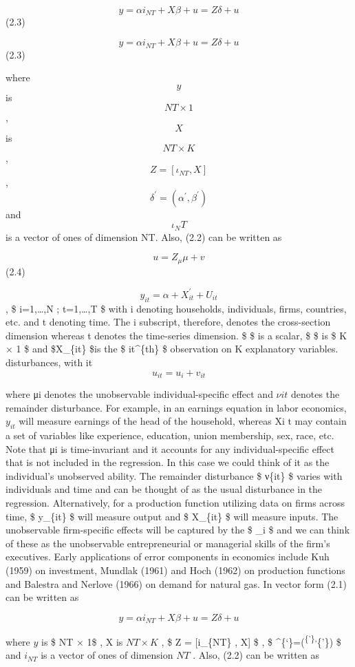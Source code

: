 \documentclass[
]{book}
\begin{document}
\[ y= \alpha i_{NT} + X \beta + u = Z \delta + u      \] (2.3)

\[ y= \alpha i_{NT} + X \beta + u = Z \delta + u      \] (2.3)

where \[ y \] is \[ NT × 1 \], \[ X \] is \[ NT × K \], \[ Z = [ι_{NT} , X] \],
\[ \delta^{'} = (α^{'},\beta^{'}) \] and \[ι_NT\] is a vector of ones of
dimension NT. Also, (2.2) can be written as

\[ u=Z_\mu \mu +v  \] (2.4)

\[  y_{it} = \alpha + X_{it}^{'} + U_{it}   \] , \$ i=1,\ldots,N ; t=1,\ldots,T \$
with i denoting households, individuals, firms, countries, etc. and t denoting time. The i subscript, therefore, denotes the cross-section dimension whereas t denotes the time-series dimension. \$ \alpha \$ is a scalar, \$ \beta \$ is \$ K × 1 \$ and \$X\_\{it\} \$is the \$ it\^{}\{th\} \$ observation on K explanatory variables.
disturbances, with it
\[ u_{it}=u_i  + v_{it}     \]

where μi denotes the unobservable individual-specific effect and \(ν{it}\) denotes the remainder disturbance. For example, in an earnings equation in labor economics, \(y_{it}\) will measure earnings of the head of the household, whereas Xi t may contain a set of variables like experience, education, union membership, sex, race, etc. Note that μi is time-invariant and it accounts for any individual-specific effect that is not included in the regression. In this case we could think of it as the individual's unobserved ability. The remainder disturbance \$ ν\{it\} \$ varies with individuals
and time and can be thought of as the usual disturbance in the regression. Alternatively, for a production function utilizing data on firms across time, \$ y\_\{it\} \$ will measure output and \$ X\_\{it\} \$ will measure inputs. The unobservable firm-specific effects will be captured by the \$ \mu\_i \$ and we can think of these as the unobservable entrepreneurial or managerial skills of the firm's executives. Early applications of error components in economics include Kuh (1959) on investment, Mundlak (1961) and Hoch (1962) on production functions and Balestra and Nerlove (1966) on demand for natural gas. In vector form (2.1) can be written as

\[ y= \alpha i_{NT}  + X\beta +u = Z\delta + u \]

where \(y\) is \$ NT × 1\$ , X is \(NT × K\) , \$ Z = {[}i\_\{NT\} , X{]} \$ , \$ \delta\^{}\{`\}=(\alpha\textsuperscript{\{'\},\beta}\{'\}) \$ and \(i_{NT}\) is a vector of ones of dimension \(NT\) . Also, (2.2) can be written as
\end{document}
